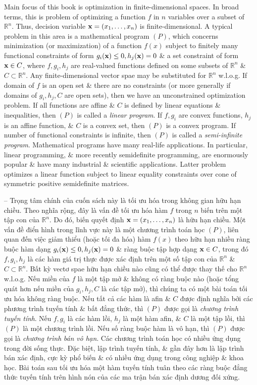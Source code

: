 \documentclass{article}
\begin{document}
\begin{itemize}
    Main focus of this book is optimization in finite-dimensional spaces. In broad terms, this is problem of optimizing a function $f$ in $n$ variables over a subset of $\mathbb{R}^n$. Thus, decision variable ${\bf x} = (x_1,\ldots,x_n)$ is finite-dimensional. A typical problem in this area is a mathematical program $(P)$, which concerns minimization (or maximization) of a function $f(x)$ subject to finitely many functional constraints of form $g_i({\bf x})\le0,h_j({\bf x}) = 0$ \& a set constraint of form ${\bf x}\in C$, where $f,g_i,h_j$ are real-valued functions defined on some subsets of $\mathbb{R}^n$ \& $C\subset\mathbb{R}^n$. Any finite-dimensional vector spae may be substituted for $\mathbb{R}^n$ w.l.o.g. If domain of $f$ is an open set \& there are no constraints (or more generally if domains of $g_i,h_j,C$ are open sets), then we have an unconstrained optimization problem. If all functions are affine \& $C$ is defined by linear equations \& inequalities, then $(P)$ is called a {\it linear program}. If $f,g_i$ are convex functions, $h_j$ is an affine function, \& $C$ is a convex set, then $(P)$ is a convex program. If number of functional constraints is infinite, then $(P)$ is called a {\it semi-infinite program}. Mathematical programs have many real-life applications. In particular, linear programming, \& more recently semidefinite programming, are enormously popular \& have many industrial \& scientific applications. Latter problem optimizes a linear function subject to linear equality constraints over cone of symmetric positive semidefinite matrices.
    
    -- Trọng tâm chính của cuốn sách này là tối ưu hóa trong không gian hữu hạn chiều. Theo nghĩa rộng, đây là vấn đề tối ưu hóa hàm $f$ trong $n$ biến trên một tập con của $\mathbb{R}^n$. Do đó, biến quyết định ${\bf x} = (x_1,\ldots,x_n)$ là hữu hạn chiều. Một vấn đề điển hình trong lĩnh vực này là một chương trình toán học $(P)$, liên quan đến việc giảm thiểu (hoặc tối đa hóa) hàm $f(x)$ theo hữu hạn nhiều ràng buộc hàm dạng $g_i({\bf x})\le0,h_j({\bf x}) = 0$ \& ràng buộc tập hợp dạng ${\bf x}\in C$, trong đó $f,g_i,h_j$ là các hàm giá trị thực được xác định trên một số tập con của $\mathbb{R}^n$ \& $C\subset\mathbb{R}^n$. Bất kỳ vectơ spae hữu hạn chiều nào cũng có thể được thay thế cho $\mathbb{R}^n$ w.l.o.g. Nếu miền của $f$ là một tập mở \& không có ràng buộc nào (hoặc tổng quát hơn nếu miền của $g_i,h_j,C$ là các tập mở), thì chúng ta có một bài toán tối ưu hóa không ràng buộc. Nếu tất cả các hàm là afin \& $C$ được định nghĩa bởi các phương trình tuyến tính \& bất đẳng thức, thì $(P)$ được gọi là {\it chương trình tuyến tính}. Nếu $f,g_i$ là các hàm lồi, $h_j$ là một hàm afin, \& $C$ là một tập lồi, thì $(P)$ là một chương trình lồi. Nếu số ràng buộc hàm là vô hạn, thì $(P)$ được gọi là {\it chương trình bán vô hạn}. Các chương trình toán học có nhiều ứng dụng trong đời sống thực. Đặc biệt, lập trình tuyến tính, \& gần đây hơn là lập trình bán xác định, cực kỳ phổ biến \& có nhiều ứng dụng trong công nghiệp \& khoa học. Bài toán sau tối ưu hóa một hàm tuyến tính tuân theo các ràng buộc đẳng thức tuyến tính trên hình nón của các ma trận bán xác định dương đối xứng.
    

\end{itemize}
\end{document}
